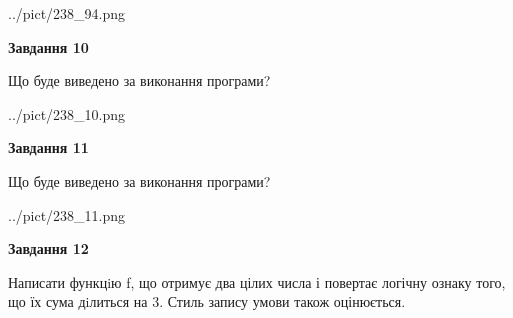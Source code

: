 \documentclass[12pt, ukrainian]{article}
\begin{document}
{\begin {large}
\begin{center}
	{../pict/238_94.png}
\end{center}
\newpage

{\begin {center}\textbf{Завдання 10}\end {center}}

Що буде виведено за виконання програми?\par
\begin{center}
	{../pict/238_10.png}
\end{center}
\newpage

{\begin {center}\textbf{Завдання 11}\end {center}}

Що буде виведено за виконання програми?\par
\begin{center}
	{../pict/238_11.png}
\end{center}
\newpage

{\begin {center}\textbf{Завдання 12}\end {center}}


Написати функцiю f, що отримує два цілих числа і повертає логічну ознаку того, що їх сума дiлиться на 3. Стиль запису умови також оцінюється.\par
\newpage

\end {large}}
\end{document}
